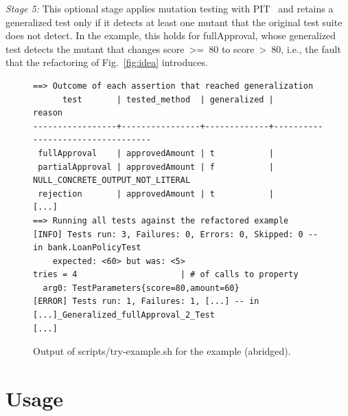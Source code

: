 \documentclass[10pt,conference]{IEEEtran}
\newcommand{\codefont}{\fontfamily{lmtt}\selectfont}
\newcommand{\code}[1]{{\codefont #1}}
\newcommand{\runin}[1]{\textit{#1:}}
\begin{document}
\runin{Stage 5}
This optional stage applies mutation testing with PIT~\cite{coles_2016_pit} and retains a generalized test only if it detects at least one mutant that the original test suite does not detect.
In the example, this holds for \code{fullApproval}, whose generalized test detects the mutant that changes \mbox{\code{score >= 80}} to \mbox{\code{score > 80}}, i.e., the fault that the refactoring of Fig.~\ref{fig:idea} introduces.

\begin{figure}[t]
\begin{lstlisting}[style=console]
==> Outcome of each assertion that reached generalization
      test       | tested_method  | generalized |              reason
-----------------+----------------+-------------+----------------------------------
 fullApproval    | approvedAmount | t           |
 partialApproval | approvedAmount | f           | NULL_CONCRETE_OUTPUT_NOT_LITERAL
 rejection       | approvedAmount | t           |
[...]
==> Running all tests against the refactored example
[INFO] Tests run: 3, Failures: 0, Errors: 0, Skipped: 0 -- in bank.LoanPolicyTest
    expected: <60> but was: <5>
tries = 4                     | # of calls to property
  arg0: TestParameters{score=80,amount=60}
[ERROR] Tests run: 1, Failures: 1, [...] -- in [...]_Generalized_fullApproval_2_Test
[...]
\end{lstlisting}
\caption{Output of \code{scripts/try-example.sh} for the example (abridged).}
\label{fig:output}
\end{figure}

\section{Usage}
\label{sec:usage}
\end{document}
